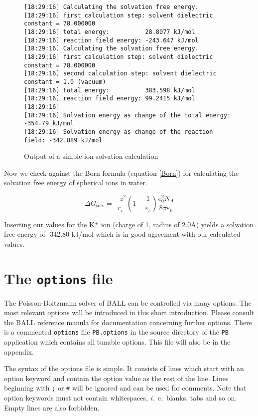 \documentclass[12pt,twoside,a4paper]{article}
\begin{document}
\begin{figure}[H]
\scriptsize
\begin{verbatim}
[18:29:16] Calculating the solvation free energy.
[18:29:16] first calculation step: solvent dielectric constant = 78.000000
[18:29:16] total energy:          28.8077 kJ/mol
[18:29:16] reaction field energy: -243.647 kJ/mol
[18:29:16] Calculating the solvation free energy.
[18:29:16] first calculation step: solvent dielectric constant = 78.000000
[18:29:16] second calculation step: solvent dielectric constant = 1.0 (vacuum)
[18:29:16] total energy:          383.598 kJ/mol
[18:29:16] reaction field energy: 99.2415 kJ/mol
[18:29:16] 
[18:29:16] Solvation energy as change of the total energy:   -354.79 kJ/mol
[18:29:16] Solvation energy as change of the reaction field: -342.889 kJ/mol
\end{verbatim}
\normalsize
\caption{Output of a simple ion solvation calculation}
\label{outputK}
\end{figure}

Now we check against the Born\cite{Born1920} formula (equation \ref{Born}) for
calculating the solvation free energy of spherical ions in water.

\begin{equation}
\Delta G_{\mathrm{solv}} = \frac{-z^2}{r_i} \left(1 - \frac{1}{\varepsilon_s}\right) \frac{e_0^2 N_A}{8 \pi \varepsilon_0}
\label{Born}
\end{equation}

Inserting our values for the K$^+$ ion (charge of 1, radius of 2.0\AA)
yields a solvation free energy of -342.80 kJ/mol which is in good agreement
with our calculated values.

\section{The {\tt options} file}

The Poisson-Boltzmann solver of BALL can be controlled via many options.
The most relevant options will be introduced in this short introduction.
Please consult the BALL reference manula for documentation concerning
further options. There is a commented {\tt options} file {\tt PB.options}
in the source directory of the {\tt PB} application which contains all
tunable options. This file will also be in the appendix. 

The syntax of the options file is simple. It consists of lines which start
with an option keyword and contain the option value as the rest of the
line. Lines beginning with \verb+;+ or \verb+#+ will be ignored and can be
used for comments. Note that option keywords must not contain whitespaces,
{\textit i.~e.~}blanks, tabs and so on. Empty lines are also forbidden.
\end{document}
